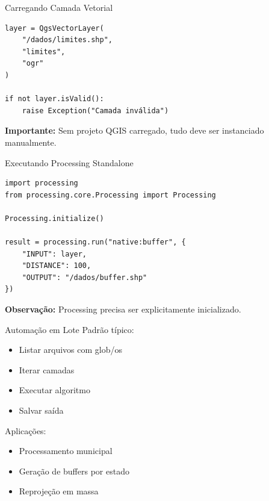 \documentclass{beamer}
\begin{document}
\begin{frame}[fragile]{Carregando Camada Vetorial}
    \begin{verbatim}
layer = QgsVectorLayer(
    "/dados/limites.shp",
    "limites",
    "ogr"
)

if not layer.isValid():
    raise Exception("Camada inválida")
    \end{verbatim}
    
    \textbf{Importante:}
    Sem projeto QGIS carregado, tudo deve ser instanciado manualmente.
\end{frame}

\begin{frame}[fragile]{Executando Processing Standalone}
    \begin{verbatim}
import processing
from processing.core.Processing import Processing

Processing.initialize()

result = processing.run("native:buffer", {
    "INPUT": layer,
    "DISTANCE": 100,
    "OUTPUT": "/dados/buffer.shp"
})
    \end{verbatim}
    
    \textbf{Observação:}
    Processing precisa ser explicitamente inicializado.
\end{frame}

\begin{frame}{Automação em Lote}
    Padrão típico:
    
    \begin{itemize}
        \item Listar arquivos com glob/os
        \item Iterar camadas
        \item Executar algoritmo
        \item Salvar saída
    \end{itemize}
    
    \vspace{0.4cm}
    
    Aplicações:
    \begin{itemize}
        \item Processamento municipal
        \item Geração de buffers por estado
        \item Reprojeção em massa
    \end{itemize}
\end{frame}
\end{document}
